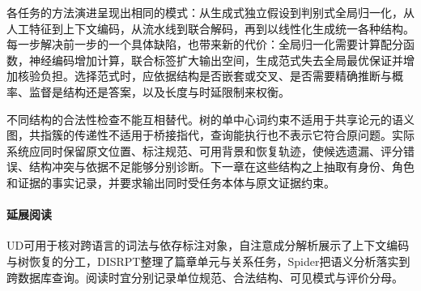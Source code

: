 各任务的方法演进呈现出相同的模式：从生成式独立假设到判别式全局归一化，从人工特征到上下文编码，从流水线到联合解码，再到以线性化生成统一各种结构。每一步解决前一步的一个具体缺陷，也带来新的代价：全局归一化需要计算配分函数，神经编码增加计算，联合标签扩大输出空间，生成范式失去全局最优保证并增加核验负担。选择范式时，应依据结构是否嵌套或交叉、是否需要精确推断与概率、监督是结构还是答案，以及长度与时延限制来权衡。

不同结构的合法性检查不能互相替代。树的单中心词约束不适用于共享论元的语义图，共指簇的传递性不适用于桥接指代，查询能执行也不表示它符合原问题。实际系统应同时保留原文位置、标注规范、可用背景和恢复轨迹，使候选遗漏、评分错误、结构冲突与依据不足能够分别诊断。下一章在这些结构之上抽取有身份、角色和证据的事实记录，并要求输出同时受任务本体与原文证据约束。

\paragraph{延展阅读}
UD可用于核对跨语言的词法与依存标注对象，自注意成分解析展示了上下文编码与树恢复的分工，DISRPT整理了篇章单元与关系任务，Spider把语义分析落实到跨数据库查询。阅读时宜分别记录单位规范、合法结构、可见模式与评价分母。
